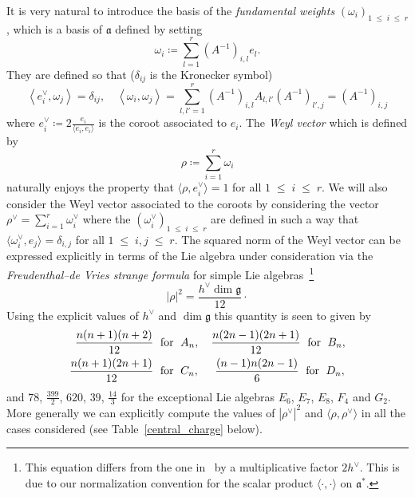 \documentclass[10pt]{amsart}
\theoremstyle{definition}\newtheorem{defi}[theo]{Definition}\newtheorem{rema}[theo]{Remark}\newtheorem{exam}[theo]{Example}\newtheorem{exem}[theo]{Example}\newtheorem{nota}[theo]{Notation}
\renewcommand{\leq}{\;\leqslant\;}
\newcommand{\frkg}{\mathfrak{g}}
\newcommand{\frka}{\mathfrak{a}}
\newcommand{\ps}[1]{\langle #1 \rangle}
\newcommand{\norm}[1]{\left\lvert#1\right\rvert}
\begin{document}
It is very natural to introduce the basis of the \emph{fundamental weights} $(\omega_i)_{1\leq i \leq r}$, which is a basis of $\frka$ defined by setting
\begin{equation}
\omega_i\coloneqq \sum_{l=1}^{r} \left(A^{-1}\right)_{i,l}e_l.
\end{equation}
They are defined so that ($ \delta_{ij}$ is the Kronecker symbol)
\begin{equation}\label{relweights}
\left\langle e_i^{\vee},\omega_j\right\rangle= \delta_{ij},\quad \left\langle \omega_i,\omega_j \right\rangle= \sum_{l,l'=1}^{r} \left(A^{-1}\right)_{i,l} A_{l,l'} \left(A^{-1}\right)_{l',j}=\left(A^{-1}\right)_{i,j}
\end{equation}
where $e_i^{\vee}\coloneqq 2\frac{e_i}{\ps{e_i,e_i}}$ is the coroot associated to $e_i$. The \emph{Weyl vector} which is defined by
\begin{equation}
\rho\coloneqq \sum_{i=1}^r \omega_i
\end{equation}
naturally enjoys the property that $\ps{\rho,e_i^{\vee}}=1$ for all $1\leq i\leq r$. We will also consider the Weyl vector associated to the coroots by considering the vector $\rho^\vee=\sum_{i=1}^r\omega_i^\vee$ where the $(\omega_i^\vee)_{1\leq i\leq r}$ are defined in such a way that $\ps{\omega_i^{\vee},e_j}=\delta_{i,j}$ for all $1\leq i,j\leq r$. The squared norm of the Weyl vector can be expressed explicitly in terms of the Lie algebra under consideration via the \emph{Freudenthal--de Vries strange formula} for simple Lie algebras~\cite[Equation~(47.11)]{FdV}\footnote{This equation differs from the one in~\cite{FdV} by a multiplicative factor $2h^\vee$. This is due to our normalization convention for the scalar product $\ps{\cdot,\cdot}$ on $\frka^*$.}
\begin{equation}
\norm{\rho}^2=\frac{h^\vee\dim \frkg}{12}\cdot
\end{equation}
Using the explicit values of $h^\vee$ and $\dim \frkg$ this quantity is seen to given by
\begin{equation}\label{Weyl_norm}
\begin{split}
\frac{n(n+1)(n+2)}{12}\;&\text{ for }\;A_n,\quad\frac{n(2n-1)(2n+1)}{12}\;\text{ for }\;B_n,\\
\frac{n(n+1)(2n+1)}{12}\;&\text{ for }\;C_n,\mkern25mu\frac{(n-1)n(2n-1)}{6}\;\text{ for }\;D_n,
\end{split}
\end{equation}
and $78$, $\frac{399}{2}$, $620$, $39$, $\frac{14}{3}$ for the exceptional Lie algebras $E_6$, $E_7$, $E_8$, $F_4$ and $G_2$. More generally we can explicitly compute the values of $\norm{\rho^\vee}^2$ and $\ps{\rho,\rho^\vee}$ in all the cases considered (see Table~\eqref{central_charge} below).
\end{document}
